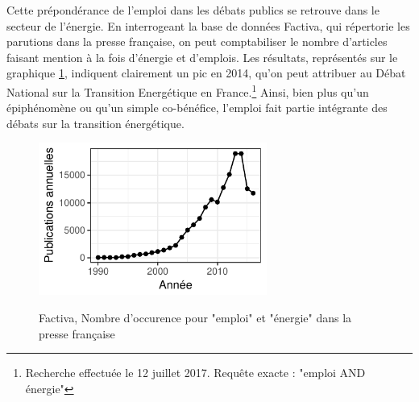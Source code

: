 Cette prépondérance de l'emploi dans les débats publics se retrouve dans le secteur de l'énergie. 
En interrogeant la base de données Factiva, qui répertorie les parutions dans la presse française, on peut comptabiliser le nombre d'articles faisant mention à la fois d'énergie et d'emplois. 
Les résultats, représentés sur le graphique \ref{fig:Factiva}, indiquent clairement un pic en 2014, qu'on peut attribuer au Débat National sur la Transition Energétique en France.\footnote{Recherche effectuée le 12 juillet 2017. Requête exacte : "emploi AND énergie"} 
Ainsi, bien plus qu’un épiphénomène ou qu’un simple co-bénéfice, l’emploi fait partie intégrante des débats sur la transition énergétique. 

\begin{figure}[h!]
	\centering
	\caption{Factiva, Nombre d'occurence pour "emploi" et "énergie" dans la presse française}
	\includegraphics[height=5cm]{figures/Factiva.pdf}
	\label{fig:Factiva}
\end{figure}

